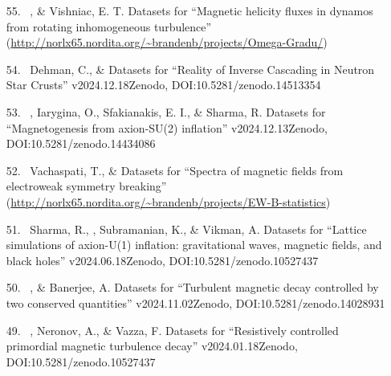 \begin{itemize}

\item[{55.}~]
\Brandenburg, \& Vishniac, E. T.
{Datasets for ``Magnetic helicity fluxes in dynamos from rotating inhomogeneous turbulence''}
{(\url{http://norlx65.nordita.org/~brandenb/projects/Omega-Gradu/})}

\item[{54.}~]
Dehman, C., \& \Brandenburg{}
{Datasets for ``Reality of Inverse Cascading in Neutron Star Crusts'' v2024.12.18}{Zenodo, DOI:10.5281/zenodo.14513354}

\item[{53.}~]
\Brandenburg, Iarygina, O., Sfakianakis, E. I., \& Sharma, R.
{Datasets for ``Magnetogenesis from axion-SU(2) inflation'' v2024.12.13}{Zenodo, DOI:10.5281/zenodo.14434086}

\item[{52.}~]
Vachaspati, T., \& \Brandenburg{}
{Datasets for ``Spectra of magnetic fields from electroweak symmetry breaking''}
{(\url{http://norlx65.nordita.org/~brandenb/projects/EW-B-statistics})}

\item[{51.}~]
Sharma, R., \Brandenburg, Subramanian, K., \& Vikman, A.
{Datasets for ``Lattice simulations of axion-U(1) inflation: gravitational waves, magnetic fields, and black holes'' v2024.06.18}{Zenodo, DOI:10.5281/zenodo.10527437}

\item[{50.}~]
\Brandenburg, \& Banerjee, A.
{Datasets for ``Turbulent magnetic decay controlled by two conserved quantities'' v2024.11.02}{Zenodo, DOI:10.5281/zenodo.14028931}

\item[{49.}~]
\Brandenburg, Neronov, A., \& Vazza, F.
{Datasets for ``Resistively controlled primordial magnetic turbulence decay'' v2024.01.18}{Zenodo, DOI:10.5281/zenodo.10527437}


\end{itemize}
